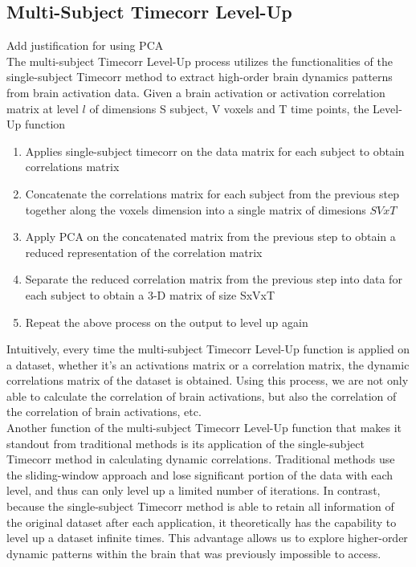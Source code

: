 \documentclass[12pt]{article}
\begin{document}
\subsection{Multi-Subject Timecorr Level-Up}
Add justification for using PCA\\

The multi-subject Timecorr Level-Up process utilizes the functionalities of the single-subject Timecorr method to extract high-order brain dynamics patterns from brain activation data. Given a brain activation or activation correlation matrix at level $l$ of dimensions S subject, V voxels and T time points, the Level-Up function\\
\begin{enumerate}
\item Applies single-subject timecorr on the data matrix for each subject to obtain correlations matrix\\
\item Concatenate the correlations matrix for each subject from the previous step together along the voxels dimension into a single matrix of dimesions $SVxT$\\
\item Apply PCA on the concatenated matrix from the previous step to obtain a reduced representation of the correlation matrix\\
\item Separate the reduced correlation matrix from the previous step into data for each subject to obtain a 3-D matrix of size SxVxT
\item Repeat the above process on the output to level up again
\end{enumerate}
Intuitively, every time the multi-subject Timecorr Level-Up function is applied on a dataset, whether it's an activations matrix or a correlation matrix, the dynamic correlations matrix of the dataset is obtained. Using this process, we are not only able to calculate the correlation of brain activations, but also the correlation of the correlation of brain activations, etc. \\
Another function of the multi-subject Timecorr Level-Up function that makes it standout from traditional methods is its application of the single-subject Timecorr method in calculating dynamic correlations. Traditional methods use the sliding-window approach and lose significant portion of the data with each level, and thus can only level up a limited number of iterations. In contrast, because the single-subject Timecorr method is able to retain all information of the original dataset after each application, it theoretically has the capability to level up a dataset infinite times. This advantage allows us to explore higher-order dynamic patterns within the brain that was previously impossible to access.\\
\end{document}
